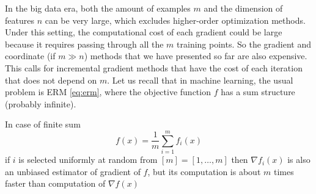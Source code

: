 In the big data era, both the amount of examples $m$ and the dimension of features $n$ can be very large, which excludes higher-order optimization methods. Under this setting, the computational cost of each gradient could be large because it requires passing through all the $m$ training points. So the gradient and coordinate (if $m\gg n$)  methods that we have presented so far are also expensive. This calls for incremental gradient methods that have the cost of each iteration that does not depend on $m$. Let us recall that in machine learning, the usual problem is ERM \eqref{eq:erm}, where the objective function $f$ has a sum structure (probably infinite).

In case of finite sum
$$
f(x) = \frac{1}{m}\sum_{i=1}^m f_i(x)
$$
if $i$ is selected uniformly at random from $[m] = [1,\dots,m]$ then $\nabla f_i(x)$ is also an unbiased estimator of gradient of $f$, but its computation is about $m$ times faster than computation of $\nabla f(x)$

